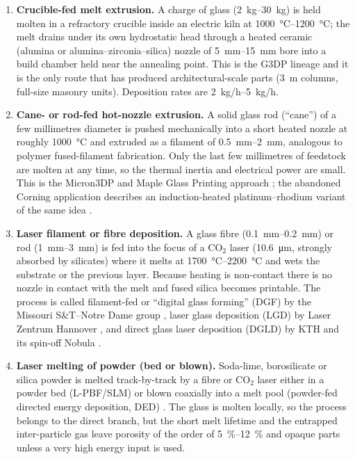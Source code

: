 \begin{enumerate}[leftmargin=*,itemsep=2pt]
  \item \textbf{Crucible-fed melt extrusion.} A charge of glass (\SIrange{2}{30}{kg}) is held molten in a refractory crucible inside an electric kiln at \SIrange{1000}{1200}{\celsius}; the melt drains under its own hydrostatic head through a heated ceramic (alumina or alumina--zirconia--silica) nozzle of \SIrange{5}{15}{mm} bore into a build chamber held near the annealing point. This is the G3DP lineage \citep{klein2015,inamura2018,mit2024masonry,patent_us10266442,patent_us9919510} and it is the only route that has produced architectural-scale parts (\SI{3}{m} columns, full-size masonry units). Deposition rates are \SIrange{2}{5}{kg/h}.
  \item \textbf{Cane- or rod-fed hot-nozzle extrusion.} A solid glass rod (``cane'') of a few millimetres diameter is pushed mechanically into a short heated nozzle at roughly \SI{1000}{\celsius} and extruded as a filament of \SIrange{0.5}{2}{mm}, analogous to polymer fused-filament fabrication. Only the last few millimetres of feedstock are molten at any time, so the thermal inertia and electrical power are small. This is the Micron3DP and Maple Glass Printing approach \citep{micron3dp_acers,maple_ammedia,threednatives2025}; the abandoned Corning application describes an induction-heated platinum--rhodium variant of the same idea \citep{patent_corning2021}.
  \item \textbf{Laser filament or fibre deposition.} A glass fibre (\SIrange{0.1}{0.2}{mm}) or rod (\SIrange{1}{3}{mm}) is fed into the focus of a CO$_2$ laser (\SI{10.6}{\micro\metre}, strongly absorbed by silicates) where it melts at \SIrange{1700}{2200}{\celsius} and wets the substrate or the previous layer. Because heating is non-contact there is no nozzle in contact with the melt and fused silica becomes printable. The process is called filament-fed or ``digital glass forming'' (DGF) by the Missouri S\&T--Notre Dame group \citep{luo2017sodalime,luo2018quartz,kinzel2025dgf}, laser glass deposition (LGD) by Laser Zentrum Hannover \citep{witzendorff2018,lgd2021coaxial,lgd2024homog}, and direct glass laser deposition (DGLD) by KTH and its spin-off Nobula \citep{kth2022bonding,kth2024microlens,nobula_web}.
  \item \textbf{Laser melting of powder (bed or blown).} Soda-lime, borosilicate or silica powder is melted track-by-track by a fibre or CO$_2$ laser either in a powder bed (L-PBF/SLM) \citep{fateri2015,khmyrov2016,datsiou2019,datsiou2021,slmirregular2023,boro2025laser} or blown coaxially into a melt pool (powder-fed directed energy deposition, DED) \citep{spirrett2023,lang2024}. The glass is molten locally, so the process belongs to the direct branch, but the short melt lifetime and the entrapped inter-particle gas leave porosity of the order of \SIrange{5}{12}{\percent} and opaque parts unless a very high energy input is used.
\end{enumerate}

